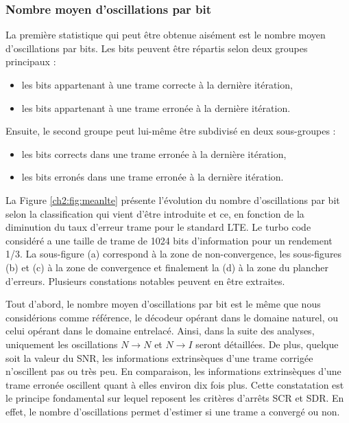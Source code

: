 \subsubsection{Nombre moyen d'oscillations par bit}
La première statistique qui peut être obtenue aisément est le nombre moyen d'oscillations par bits. Les bits peuvent être 
répartis selon deux groupes principaux :
\begin{itemize}
	\item les bits appartenant à une trame correcte à la dernière itération,
	\item les bits appartenant à une trame erronée à la dernière itération.\newline
\end{itemize}\vspace*{-1em}
Ensuite, le second groupe peut lui-même être subdivisé en deux sous-groupes :
\begin{itemize}
	\item les bits corrects dans une trame erronée à la dernière itération,
	\item les bits erronés dans une trame erronée à la dernière itération. \newline
\end{itemize}
La Figure \ref{ch2:fig:meanlte} présente l'évolution du nombre d'oscillations par bit selon la classification qui 
vient d'être introduite et ce, en fonction de la diminution du taux d'erreur trame pour le standard LTE. Le turbo code 
considéré a une taille de trame de 1024 bits d'information pour un rendement 1/3. La sous-figure 
(a) correspond à la zone de non-convergence, les sous-figures (b) et (c) à la zone de convergence et finalement la (d) à 
la zone du plancher d'erreurs. Plusieurs constations notables peuvent en être extraites. 

Tout d'abord, le nombre moyen d'oscillations par bit est le même que nous considérions comme référence, le décodeur opérant dans le 
domaine naturel, ou celui opérant dans le domaine entrelacé. Ainsi, dans la suite des analyses, uniquement les oscillations $N\rightarrow N$ 
et $N\rightarrow I$ seront détaillées.
De plus, quelque soit la valeur du SNR, les informations extrinsèques d'une trame corrigée n'oscillent pas ou très 
peu. En comparaison, les informations extrinsèques d'une trame erronée oscillent quant à elles environ dix fois plus.
Cette constatation est le principe fondamental sur lequel reposent les critères d'arrêts SCR et SDR. En effet, le nombre 
d'oscillations permet d'estimer si une trame a convergé ou non.


